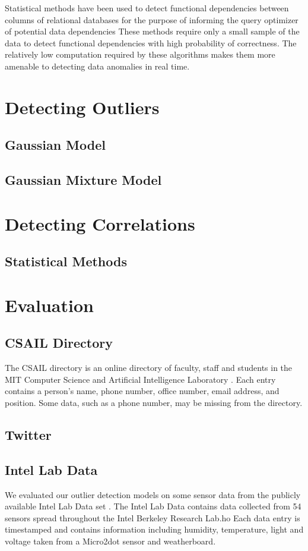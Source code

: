 \documentclass{vldb}
\begin{document}
Statistical methods have been used to detect functional dependencies between columns of relational databases for the purpose of informing the query optimizer of potential data dependencies \cite{Ilyas2004} 
These methods require only a small sample of the data to detect functional dependencies with high probability of correctness.
The relatively low computation required by these algorithms makes them more amenable to detecting data anomalies in real time.

\section{Detecting Outliers}

\subsection{Gaussian Model}
\subsection{Gaussian Mixture Model}

\section{Detecting Correlations}

\subsection{Statistical Methods}

\section{Evaluation}
\subsection{CSAIL Directory}
The CSAIL directory is an online directory of faculty, staff and students in the MIT Computer Science and Artificial Intelligence Laboratory \cite{CSAILDirectory}.
Each entry contains a person's name, phone number, office number, email address, and position.
Some data, such as a phone number, may be missing from the directory.

\subsection{Twitter}

\subsection{Intel Lab Data}
We evaluated our outlier detection models on some sensor data from the publicly available Intel Lab Data set \cite{IntelLabData}.
The Intel Lab Data contains data collected from 54 sensors spread throughout the Intel Berkeley Research Lab.ho
Each data entry is timestamped and contains information including humidity, temperature, light and voltage taken from a Micro2dot sensor and weatherboard.
\end{document}
